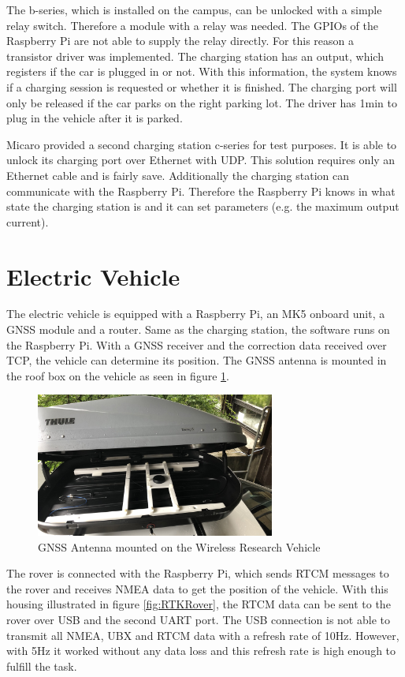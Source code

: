The b-series, which is installed on the campus, can be unlocked with a simple relay switch. Therefore a module with a relay was needed. The GPIOs of the Raspberry Pi are not able to supply the relay directly. For this reason a transistor driver was implemented. The charging station has an output, which registers if the car is plugged in or not. With this information, the system knows if a charging session is requested or whether it is finished. The charging port will only be released if the car parks on the right parking lot. The driver has 1\;min to plug in the vehicle after it is parked.

Micaro provided a second charging station c-series for test purposes. It is able to unlock its charging port over Ethernet with UDP. This solution requires only an Ethernet cable and is fairly save. Additionally the charging station can communicate with the Raspberry Pi. Therefore the Raspberry Pi knows in what state the charging station is and it can set parameters (e.g. the maximum output current).
\newpage
\section{Electric Vehicle}

The electric vehicle is equipped with a Raspberry Pi, an MK5 onboard unit, a GNSS module and a router. Same as the charging station, the software runs on the Raspberry Pi. With a GNSS receiver and the correction data received over TCP, the vehicle can determine its position. The GNSS antenna is mounted in the roof box on the vehicle as seen in figure \ref{fig:AntennaMount}.

\begin{figure}[htb]
	\centering
	\includegraphics[width=0.7\textwidth]{images/AntennaMount}
	\caption{GNSS Antenna mounted on the Wireless Research Vehicle}
	\label{fig:AntennaMount}
\end{figure}


The rover is connected with the Raspberry Pi, which sends RTCM messages to the rover and receives NMEA data to get the position of the vehicle. With this housing illustrated in figure \ref{fig:RTKRover}, the RTCM data can be sent to the rover over USB and the second UART port. The USB connection is not able to transmit all NMEA, UBX and RTCM data with a refresh rate of 10\;Hz. However, with 5\;Hz it worked without any data loss and this refresh rate is high enough to fulfill the task.

